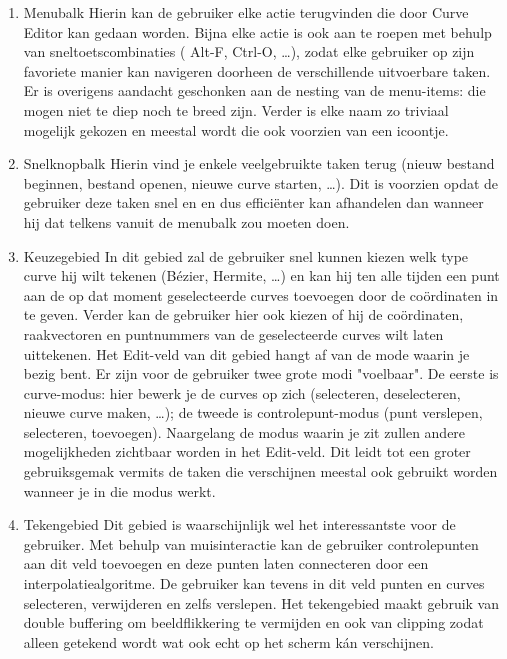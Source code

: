 \documentclass[a4paper,11pt,oneside, titlepage]{article}
\begin{document}
\begin{enumerate}
\item Menubalk
Hierin kan de gebruiker elke actie terugvinden die door Curve Editor kan gedaan worden.
Bijna elke actie is ook aan te roepen met behulp van sneltoetscombinaties ( Alt-F, Ctrl-O, \ldots ), zodat
elke gebruiker op zijn favoriete manier kan navigeren doorheen de verschillende uitvoerbare taken.
Er is overigens aandacht geschonken aan de nesting van de menu-items: die mogen niet te diep noch te breed zijn.
Verder is elke naam zo triviaal mogelijk gekozen en meestal wordt die ook voorzien van een icoontje.
\item Snelknopbalk
Hierin vind je enkele veelgebruikte taken terug (nieuw bestand beginnen, bestand openen, 
nieuwe curve starten, \ldots). Dit is voorzien opdat de gebruiker deze taken snel en en dus effici\"enter kan
afhandelen dan wanneer hij dat telkens vanuit de menubalk zou moeten doen.
\item Keuzegebied
In dit gebied zal de gebruiker snel kunnen kiezen welk type curve hij wilt tekenen (B\'ezier, 
Hermite, \ldots) en kan hij ten alle tijden een punt aan de op dat moment geselecteerde curves toevoegen door 
de co\"ordinaten in te geven. Verder kan de gebruiker hier ook kiezen of hij de co\"ordinaten, raakvectoren en 
puntnummers van de geselecteerde curves wilt laten uittekenen. \newline
Het Edit-veld van dit gebied hangt af van de mode waarin je bezig bent. Er zijn voor de gebruiker
twee grote modi "voelbaar". De eerste is curve-modus: hier bewerk je de curves op zich (selecteren, 
deselecteren, nieuwe curve maken, \ldots); de tweede is controlepunt-modus (punt verslepen, selecteren, toevoegen).
Naargelang de modus waarin je zit zullen andere mogelijkheden zichtbaar worden in het Edit-veld.
Dit leidt tot een groter gebruiksgemak vermits de taken die verschijnen meestal ook gebruikt
worden wanneer je in die modus werkt.
\item Tekengebied
Dit gebied is waarschijnlijk wel het interessantste voor de gebruiker. Met behulp van muisinteractie
kan de gebruiker controlepunten aan dit veld toevoegen en deze punten laten connecteren
door een interpolatiealgoritme. De gebruiker kan tevens in dit veld punten en curves selecteren,
verwijderen en zelfs verslepen. Het tekengebied maakt gebruik van double buffering om 
beeldflikkering te vermijden en ook van clipping zodat alleen getekend wordt wat ook echt
op het scherm k\'an verschijnen.
\end{enumerate}
\end{document}
